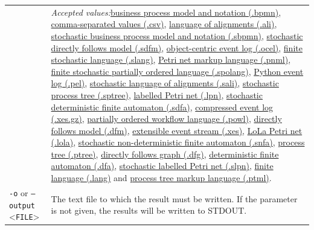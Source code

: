 {\begin{tabularx}{\linewidth}{lX}
&\textit{Accepted values:}\quad \hyperref[filehandler:business process model and notation]{business process model and notation (.bpmn)}, \hyperref[filehandler:comma-separated values]{comma-separated values (.csv)}, \hyperref[filehandler:language of alignments]{language of alignments (.ali)}, \hyperref[filehandler:stochastic business process model and notation]{stochastic business process model and notation (.sbpmn)}, \hyperref[filehandler:stochastic directly follows model]{stochastic directly follows model (.sdfm)}, \hyperref[filehandler:object-centric event log]{object-centric event log (.ocel)}, \hyperref[filehandler:finite stochastic language]{finite stochastic language (.slang)}, \hyperref[filehandler:Petri net markup language]{Petri net markup language (.pnml)}, \hyperref[filehandler:finite stochastic partially ordered language]{finite stochastic partially ordered language (.spolang)}, \hyperref[filehandler:Python event log]{Python event log (.pel)}, \hyperref[filehandler:stochastic language of alignments]{stochastic language of alignments (.sali)}, \hyperref[filehandler:stochastic process tree]{stochastic process tree (.sptree)}, \hyperref[filehandler:labelled Petri net]{labelled Petri net (.lpn)}, \hyperref[filehandler:stochastic deterministic finite automaton]{stochastic deterministic finite automaton (.sdfa)}, \hyperref[filehandler:compressed event log]{compressed event log (.xes.gz)}, \hyperref[filehandler:partially ordered workflow language]{partially ordered workflow language (.powl)}, \hyperref[filehandler:directly follows model]{directly follows model (.dfm)}, \hyperref[filehandler:extensible event stream]{extensible event stream (.xes)}, \hyperref[filehandler:LoLa Petri net]{LoLa Petri net (.lola)}, \hyperref[filehandler:stochastic non-deterministic finite automaton]{stochastic non-deterministic finite automaton (.snfa)}, \hyperref[filehandler:process tree]{process tree (.ptree)}, \hyperref[filehandler:directly follows graph]{directly follows graph (.dfg)}, \hyperref[filehandler:deterministic finite automaton]{deterministic finite automaton (.dfa)}, \hyperref[filehandler:stochastic labelled Petri net]{stochastic labelled Petri net (.slpn)}, \hyperref[filehandler:finite language]{finite language (.lang)} and \hyperref[filehandler:process tree markup language]{process tree markup language (.ptml)}.\\
\texttt{-o} or \texttt{--output} <\texttt{FILE}> &
The text file to which the result must be written. If the parameter is not given, the results will be written to STDOUT.\\

\end{tabularx}}
